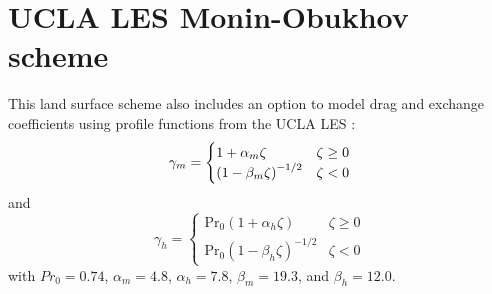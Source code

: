 \documentclass[10pt]{article}
\begin{document}
\section{UCLA LES Monin-Obukhov scheme}

This land surface scheme also includes an option to model drag and exchange coefficients using profile functions from the UCLA LES \citep{Stevens2010}:
\[
\gamma_m = 
\begin{cases}
1 + \alpha_m \zeta & \zeta \ge 0 \\
\qty(1 - \beta_m \zeta)^{-1/2} & \zeta < 0
\end{cases}
\]
and
\[
\gamma_h = 
\begin{cases}
\mathrm{Pr}_0 (1 + \alpha_h \zeta) & \zeta \ge 0 \\
\mathrm{Pr}_0 (1 - \beta_h \zeta)^{-1/2} &  \zeta < 0
\end{cases}
\]
with $Pr_0 = 0.74$, $\alpha_m = 4.8$, $\alpha_h = 7.8$, $\beta_m = 19.3$, and $\beta_h = 12.0$.
\end{document}
